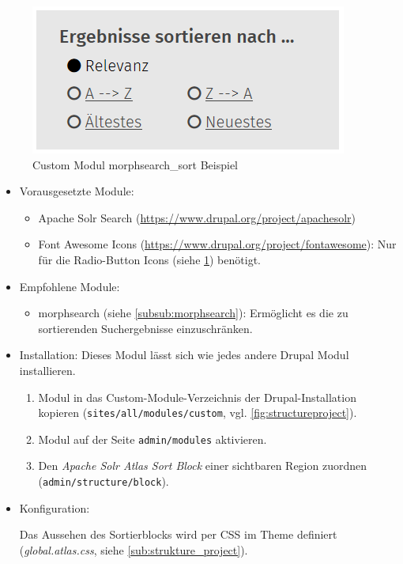 \begin{figure}[H]
	\centering
	\includegraphics[height=0.10\textheight]{images/example_morphsearchsort}
	\caption{Custom Modul morphsearch\_sort Beispiel}
	\label{fig:example_morphsearchsort}
\end{figure}

\begin{itemize}[parsep=0pt, itemsep=5.0pt plus 2.0pt minus 1.0pt, leftmargin=*]
	\item Vorausgesetzte Module:

	\begin{itemize}
		\item Apache Solr Search (\url{https://www.drupal.org/project/apachesolr})

		\item Font Awesome Icons (\url{https://www.drupal.org/project/fontawesome}): Nur für die Radio-Button Icons (siehe \cref{fig:example_morphsearchsort}) benötigt.
	\end{itemize}


	\item Empfohlene Module:

	\begin{itemize}
		\item morphsearch (siehe \cref{subsub:morphsearch}): Ermöglicht es die zu sortierenden Suchergebnisse einzuschränken.
	\end{itemize}


	\item Installation: Dieses Modul lässt sich wie jedes andere Drupal Modul installieren.
	\begin{enumerate}
		\item Modul in das Custom-Module-Verzeichnis der Drupal-Installation kopieren  (\zB \lstinline|sites/all/modules/custom|, vgl. \cref{fig:structureproject}).
		\item Modul auf der Seite \lstinline|admin/modules| aktivieren.
		\item Den \textit{Apache Solr Atlas Sort Block} einer sichtbaren Region zuordnen (\lstinline|admin/structure/block|).
	\end{enumerate}

	\item Konfiguration:

	\noconfig

	Das Aussehen des Sortierblocks wird per CSS im Theme definiert (\zB \textit{global.atlas.css}, siehe \cref{sub:strukture_project}).

\end{itemize}


